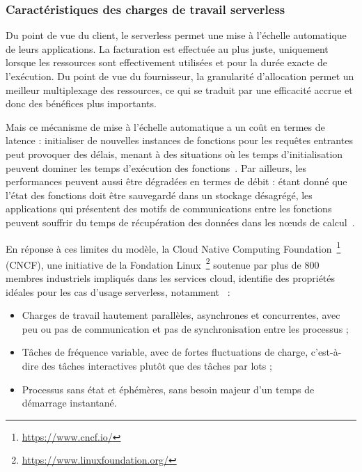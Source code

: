 \subsubsection{Caractéristiques des charges de travail serverless}

Du point de vue du client, le serverless permet une mise à l'échelle automatique de leurs applications. La facturation est effectuée au plus juste, uniquement lorsque les ressources sont effectivement utilisées et pour la durée exacte de l'exécution. Du point de vue du fournisseur, la granularité d'allocation permet un meilleur multiplexage des ressources, ce qui se traduit par une efficacité accrue et donc des bénéfices plus importants.

Mais ce mécanisme de mise à l'échelle automatique a un coût en termes de latence : initialiser de nouvelles instances de fonctions pour les requêtes entrantes peut provoquer des délais, menant à des situations où les temps d'initialisation peuvent dominer les temps d'exécution des fonctions~\cite{Jiang2021TowardsDS}. Par ailleurs, les performances peuvent aussi être dégradées en termes de débit : étant donné que l'état des fonctions doit être sauvegardé dans un stockage désagrégé, les applications qui présentent des motifs de communications entre les fonctions peuvent souffrir du temps de récupération des données dans les nœuds de calcul~\cite{mullerLambadaInteractiveData2020}.

En réponse à ces limites du modèle, la Cloud Native Computing Foundation~\footnote{\href{https://www.cncf.io/}{https://www.cncf.io/}} (\gls{CNCF}), une initiative de la Fondation Linux~\footnote{\href{https://www.linuxfoundation.org/}{https://www.linuxfoundation.org/}} soutenue par plus de 800 membres industriels impliqués dans les services cloud, identifie des propriétés idéales pour les cas d'usage serverless, notamment~\cite{cncf2018whitepaper} :

\begin{itemize}
    \item Charges de travail hautement parallèles, asynchrones et concurrentes, avec peu ou pas de communication et pas de synchronisation entre les processus ;
    \item Tâches de fréquence variable, avec de fortes fluctuations de charge, c'est-à-dire des tâches interactives plutôt que des tâches par lots ;
    \item Processus sans état et éphémères, sans besoin majeur d'un temps de démarrage instantané.
\end{itemize}

